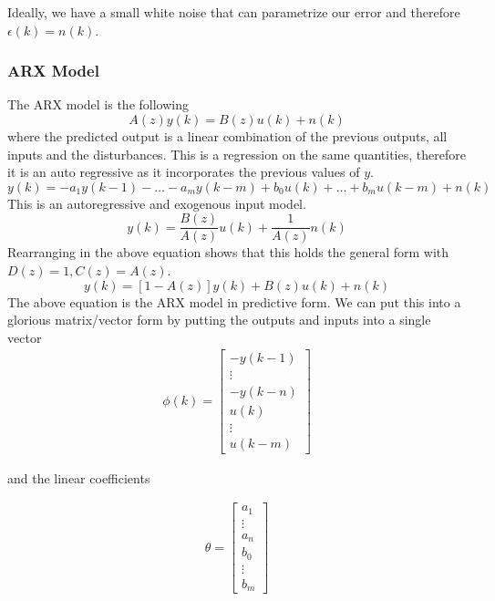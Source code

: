 \documentclass[11pt]{article}
\begin{document}
Ideally, we have a small white noise that can parametrize our error and therefore $\epsilon(k) = n(k)$.
\subsubsection{ARX Model}
The ARX model is the following
\begin{equation}
    A(z) y(k) = B(z) u(k) + n(k)
\end{equation}
where the predicted output is a linear combination of the previous outputs, all inputs and the disturbances.
This is a regression on the same quantities, therefore it is an auto regressive as it incorporates the previous values of $y$.
\begin{equation}
    y(k) = -a_1 y(k-1) - \dots - a_m y(k-m) + b_0 u(k) + \dots + b_m u(k-m) + n(k)
\end{equation}
This is an autoregressive and exogenous input model.
\begin{equation}
    y(k) = \frac{B(z)}{A(z)} u(k) + \frac{1}{A(z)} n(k)
\end{equation}
Rearranging in the above equation shows that this holds the general form with $D(z) = 1, C(z) = A(z)$.
\begin{equation}
    y(k) = [1-A(z)] y(k) + B(z) u(k) + n(k)
\end{equation}
The above equation is the ARX model in predictive form.
We can put this into a glorious matrix/vector form by putting the outputs and inputs into a single vector
\begin{align}
\phi(k) =
  \begin{bmatrix}
     -y(k-1)  \\ \vdots \\ -y(k-n) \\ u(k) \\ \vdots \\ u(k-m)
  \end{bmatrix}
\end{align}

and the linear coefficients

\begin{align}
    \theta = 
  \begin{bmatrix}
     a_1 \\ \vdots \\ a_n \\ b_0 \\ \vdots \\ b_m
  \end{bmatrix}
\end{align}
\end{document}
